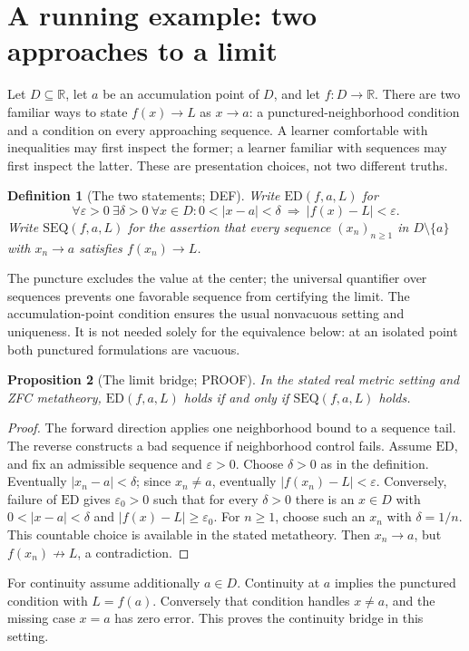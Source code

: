 \documentclass[11pt,a4paper]{article}
\newtheorem{definition}{Definition}[section]
\newtheorem{proposition}[definition]{Proposition}
\theoremstyle{remark}
\newcommand{\status}[1]{\textsf{\small #1}}
\begin{document}
\section{A running example: two approaches to a limit}\label{sec:example}
Let \(D\subseteq\mathbb R\), let \(a\) be an accumulation point of \(D\), and let
\(f:D\to\mathbb R\). There are two familiar ways to state \(f(x)\to L\) as
\(x\to a\): a punctured-neighborhood condition and a condition on every
approaching sequence. A learner comfortable with inequalities may first
inspect the former; a learner familiar with sequences may first inspect the
latter. These are presentation choices, not two different truths.

\begin{definition}[The two statements; \status{DEF}]\label{def:limits}
Write \(\mathrm{ED}(f,a,L)\) for
\[
 \forall\varepsilon>0\ \exists\delta>0\ \forall x\in D:
 0<|x-a|<\delta\ \Longrightarrow\ |f(x)-L|<\varepsilon.
\]
Write \(\mathrm{SEQ}(f,a,L)\) for the assertion that every sequence
\((x_n)_{n\geq1}\) in \(D\setminus\{a\}\) with \(x_n\to a\) satisfies
\(f(x_n)\to L\).
\end{definition}
The puncture excludes the value at the center; the universal quantifier over
sequences prevents one favorable sequence from certifying the limit.
The accumulation-point condition ensures the usual nonvacuous setting and
uniqueness. It is not needed solely for the equivalence below:
at an isolated point both punctured formulations are vacuous.

\begin{proposition}[The limit bridge; \status{PROOF}]\label{prop:limit}
In the stated real metric setting and ZFC metatheory,
\(\mathrm{ED}(f,a,L)\) holds if and only if \(\mathrm{SEQ}(f,a,L)\) holds.
\end{proposition}
\begin{proof}
The forward direction applies one neighborhood bound to a sequence tail.
The reverse constructs a bad sequence if neighborhood control fails.
Assume \(\mathrm{ED}\), and fix an admissible sequence and \(\varepsilon>0\).
Choose \(\delta>0\) as in the definition. Eventually \(|x_n-a|<\delta\);
since \(x_n\neq a\), eventually \(|f(x_n)-L|<\varepsilon\).
Conversely, failure of \(\mathrm{ED}\) gives \(\varepsilon_0>0\) such that
for every \(\delta>0\) there is an \(x\in D\) with
\(0<|x-a|<\delta\) and \(|f(x)-L|\geq\varepsilon_0\).
For \(n\geq1\), choose such an \(x_n\) with \(\delta=1/n\).
This countable choice is available in the stated metatheory.
Then \(x_n\to a\), but \(f(x_n)\not\to L\), a contradiction.
\end{proof}
For continuity assume additionally \(a\in D\). Continuity at \(a\) implies
the punctured condition with \(L=f(a)\). Conversely that condition handles
\(x\neq a\), and the missing case \(x=a\) has zero error.
This proves the continuity bridge in this setting.
\end{document}
